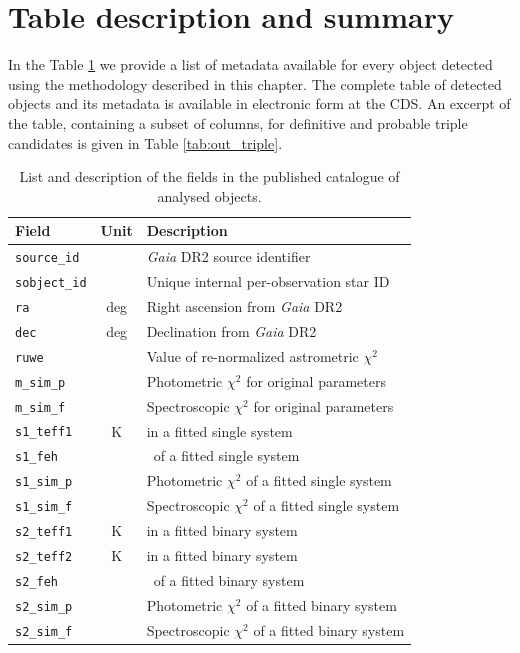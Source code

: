\section{Table description and summary}
\label{sec:outres}

In the Table \ref{tab:out_table_triple} we provide a list of metadata available for every object detected using the methodology described in this chapter. The complete table of detected objects and its metadata is available in electronic form at the CDS. An excerpt of the table, containing a subset of columns, for definitive and probable triple candidates is given in Table \ref{tab:out_triple}.

\begin{table}
	\centering
	\caption{List and description of the fields in the published catalogue of analysed objects.}
	\label{tab:out_table_triple}
	\begin{tabular}{l c l}
		\hline
		Field & Unit & Description \\ 
		\hline
		\texttt{source\_id} & & {\it Gaia} DR2 source identifier \\
		\texttt{sobject\_id} & & Unique internal per-observation star ID \\
		\texttt{ra} & deg & Right ascension from {\it Gaia} DR2 \\
		\texttt{dec} & deg & Declination from {\it Gaia} DR2 \\
		\texttt{ruwe} & & Value of re-normalized astrometric $\chi^2$ \\
		
		\texttt{m\_sim\_p} & & Photometric $\chi^2$ for original parameters \\
		\texttt{m\_sim\_f} & & Spectroscopic $\chi^2$ for original parameters \\
		
		\texttt{s1\_teff1} & K & \Teffn{1} in a fitted single system \\
		\texttt{s1\_feh} & & \Feh\ of a fitted single system \\
		\texttt{s1\_sim\_p} & & Photometric $\chi^2$ of a fitted single system \\
		\texttt{s1\_sim\_f} & & Spectroscopic $\chi^2$ of a fitted single system\\
		
		\texttt{s2\_teff1} & K & \Teffn{1} in a fitted binary system \\	
		\texttt{s2\_teff2} & K & \Teffn{2} in a fitted binary system \\
		\texttt{s2\_feh} & & \Feh\ of a fitted binary system \\
		\texttt{s2\_sim\_p} & & Photometric $\chi^2$ of a fitted binary system \\
		\texttt{s2\_sim\_f} & & Spectroscopic $\chi^2$ of a fitted binary system\\
		

\end{tabular}
\end{table}

